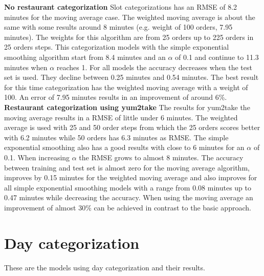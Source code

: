 \newline\newline\textbf{No restaurant categorization}\newline
Slot categorizations has an RMSE of 8.2 minutes for the moving average case. The weighted moving average is about the same with some results around 8 minutes (e.g. weight of 100 orders, 7.95 minutes). The weights for this algorithm are from 25 orders up to 225 orders in 25 orders steps. This categorization models with the simple exponential smoothing algorithm start from 8.4 minutes and an $\alpha$ of 0.1 and continue to 11.3 minutes when $\alpha$ reaches 1. For all models the accuracy decreases when the test set is used. They decline between 0.25 minutes and 0.54 minutes.\newline
The best result for this time categorization has the weighted moving average with a weight of 100. An error of 7.95 minutes results in an improvement of around 6\%.
\newline\newline\textbf{Restaurant categorization using yum2take}\newline
The results for yum2take the moving average results in a RMSE of little under 6 minutes. The weighted average is used with 25 and 50 order steps from which the 25 orders scores better with 6.2 minutes while 50 orders has 6.3 minutes as RMSE. The simple exponential smoothing also has a good results with close to 6 minutes for an $\alpha$ of 0.1. When increasing $\alpha$ the RMSE grows to almost 8 minutes. The accuracy between training and test set is almost zero for the moving average algorithm, improves by 0.15 minutes for the weighted moving average and also improves for all simple exponential smoothing models with a range from 0.08 minutes up to 0.47 minutes while decreasing the accuracy.\newline
When using the moving average an improvement of almost 30\% can be achieved in contrast to the basic approach.
\section{Day categorization}\label{section:Day categorization}
These are the models using day categorization and their results.
